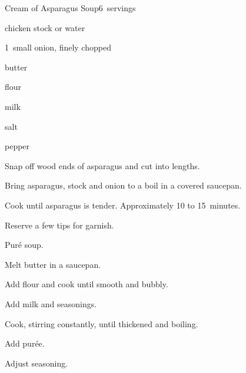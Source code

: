 \begin{recipe}{Cream of Asparagus Soup}{}{6~servings}

\begin{ingredients}
\item {} 
\item {} chicken stock or water
\item 1~small onion, finely chopped
\item {} butter
\item {} flour
\item {} milk
\item salt
\item pepper
\end{ingredients}

\begin{directions}
\item Snap off wood ends of asparagus and cut into  lengths.
\item Bring asparagus, stock and onion to a boil in a covered saucepan.
\item Cook until asparagus is tender. Approximately 10 to 15~minutes.
\item Reserve a few tips for garnish.
\item Pur\'e soup.
\item Melt butter in a saucepan.
\item Add flour and cook until smooth and bubbly.
\item Add milk and seasonings.
\item Cook, stirring constantly, until thickened and boiling.
\item Add pur\'ee.
\item Adjust seasoning.
\end{directions}

\end{recipe}
